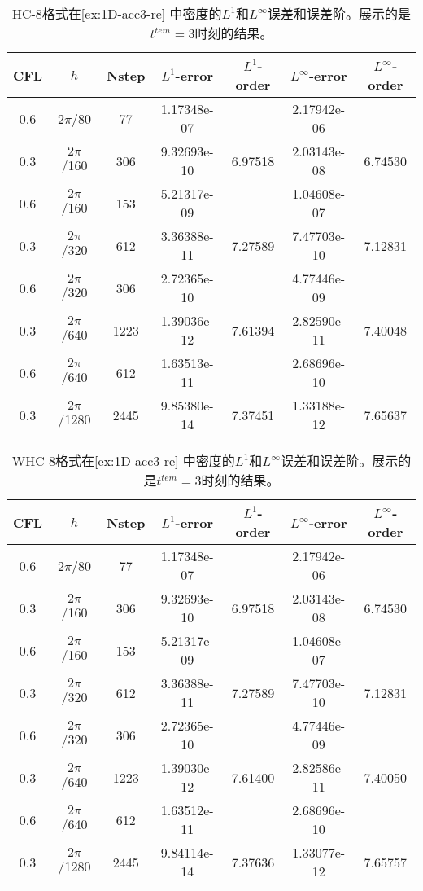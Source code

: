 \def\titleintable{CFL&$h$&Nstep&$L^1$-error&$L^1$-order&$L^\infty$-error&$L^\infty$-order\\}
\begin{table}[htbp]
	\caption{HC-8格式在\cref{ex:1D-acc3-re} 中密度的$L^1$和$L^\infty$误差和误差阶。展示的是$t^{tem} = 3$时刻的结果。}
	\label{ta:1D-ex3-HC8}
	\centering
	\begin{tabular}{ccccccc}
		\toprule
		\titleintable
		\midrule
		0.6 & $2\pi$/80   & 77   & 1.17348e-07 &         & 2.17942e-06 &         \\
		0.3 & $2\pi$/160  & 306  & 9.32693e-10 & 6.97518 & 2.03143e-08 & 6.74530 \\
		\midrule
		0.6 & $2\pi$/160  & 153  & 5.21317e-09 &         & 1.04608e-07 &         \\
		0.3 & $2\pi$/320  & 612  & 3.36388e-11 & 7.27589 & 7.47703e-10 & 7.12831 \\
		\midrule
		0.6 & $2\pi$/320  & 306  & 2.72365e-10 &         & 4.77446e-09 &         \\
		0.3 & $2\pi$/640  & 1223 & 1.39036e-12 & 7.61394 & 2.82590e-11 & 7.40048 \\
		\midrule
		0.6 & $2\pi$/640  & 612  & 1.63513e-11 &         & 2.68696e-10 &         \\
		0.3 & $2\pi$/1280 & 2445 & 9.85380e-14 & 7.37451 & 1.33188e-12 & 7.65637 \\
		\bottomrule
	\end{tabular}
\end{table}

\begin{table}[htbp]
	\caption{WHC-8格式在\cref{ex:1D-acc3-re} 中密度的$L^1$和$L^\infty$误差和误差阶。展示的是$t^{tem} = 3$时刻的结果。}
	\label{ta:1D-ex3-WHC8}
	\centering
	\begin{tabular}{ccccccc}
		\toprule
		\titleintable
		\midrule
		0.6 & $2\pi$/80   & 77   & 1.17348e-07 &         & 2.17942e-06 &         \\
		0.3 & $2\pi$/160  & 306  & 9.32693e-10 & 6.97518 & 2.03143e-08 & 6.74530 \\
		\midrule
		0.6 & $2\pi$/160  & 153  & 5.21317e-09 &         & 1.04608e-07 &         \\
		0.3 & $2\pi$/320  & 612  & 3.36388e-11 & 7.27589 & 7.47703e-10 & 7.12831 \\
		\midrule
		0.6 & $2\pi$/320  & 306  & 2.72365e-10 &         & 4.77446e-09 &         \\
		0.3 & $2\pi$/640  & 1223 & 1.39030e-12 & 7.61400 & 2.82586e-11 & 7.40050 \\
		\midrule
		0.6 & $2\pi$/640  & 612  & 1.63512e-11 &         & 2.68696e-10 &         \\
		0.3 & $2\pi$/1280 & 2445 & 9.84114e-14 & 7.37636 & 1.33077e-12 & 7.65757 \\
		\bottomrule
	\end{tabular}
\end{table}

